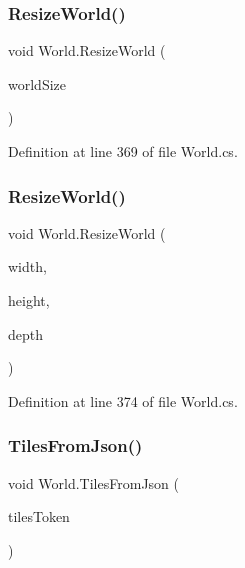 \subsubsection{\texorpdfstring{Resize\+World()}{ResizeWorld()}\hspace{0.1cm}{\footnotesize\ttfamily [1/2]}}
{\footnotesize\ttfamily void World.\+Resize\+World (\begin{DoxyParamCaption}\item[{Vector3}]{world\+Size }\end{DoxyParamCaption})}



Definition at line 369 of file World.\+cs.

\mbox{\label{class_world_a80b2ca274375a6cc12d2deabb636bde3}} 
\subsubsection{\texorpdfstring{Resize\+World()}{ResizeWorld()}\hspace{0.1cm}{\footnotesize\ttfamily [2/2]}}
{\footnotesize\ttfamily void World.\+Resize\+World (\begin{DoxyParamCaption}\item[{int}]{width,  }\item[{int}]{height,  }\item[{int}]{depth }\end{DoxyParamCaption})}



Definition at line 374 of file World.\+cs.

\mbox{\label{class_world_a70061bfa5cbd21c61d43a92437fce140}} 
\subsubsection{\texorpdfstring{Tiles\+From\+Json()}{TilesFromJson()}}
{\footnotesize\ttfamily void World.\+Tiles\+From\+Json (\begin{DoxyParamCaption}\item[{J\+Token}]{tiles\+Token }\end{DoxyParamCaption})}



